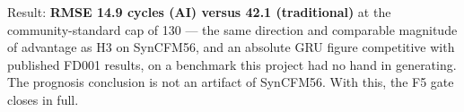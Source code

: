 Result: \textbf{RMSE 14.9 cycles (AI) versus 42.1 (traditional)} at the community-standard
cap of 130 --- the same direction and comparable magnitude of advantage as H3 on SynCFM56,
and an absolute GRU figure competitive with published FD001 results, on a benchmark this
project had no hand in generating. The prognosis conclusion is not an artifact of SynCFM56.
With this, the F5 gate closes in full.

